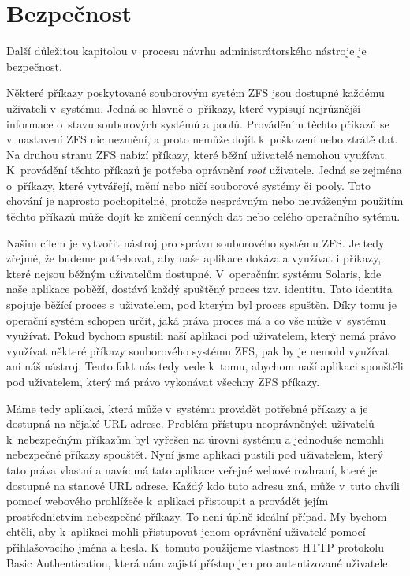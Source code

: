\section{Bezpečnost}
Další důležitou kapitolou v~procesu návrhu administrátorského nástroje je bezpečnost.

Některé příkazy poskytované souborovým systém ZFS jsou dostupné každému uživateli v~systému. Jedná se hlavně o~příkazy, které vypisují nejrůznější informace o~stavu souborových systémů a poolů. Prováděním těchto příkazů se v~nastavení ZFS nic nezmění, a proto nemůže dojít k~poškození nebo ztrátě dat. Na druhou stranu ZFS nabízí příkazy, které běžní uživatelé nemohou využívat. K~provádění těchto příkazů je potřeba oprávnění \emph{root} uživatele. Jedná se zejména o~příkazy, které vytvářejí, mění nebo ničí souborové systémy či pooly. Toto chování je naprosto pochopitelné, protože nesprávným nebo neuváženým použitím těchto příkazů může dojít ke zničení cenných dat nebo celého operačního sytému.

Našim cílem je vytvořit nástroj pro správu souborového systému ZFS. Je tedy zřejmé, že budeme potřebovat, aby naše aplikace dokázala využívat i příkazy, které nejsou běžným uživatelům dostupné. V~operačním systému Solaris, kde naše aplikace poběží, dostává každý spuštěný proces tzv. identitu. Tato identita spojuje běžící proces s~uživatelem, pod kterým byl proces spuštěn. Díky tomu je operační systém schopen určit, jaká práva proces má a co vše může v~systému využívat. Pokud bychom spustili naší aplikaci pod uživatelem, který nemá právo využívat některé příkazy souborového systému ZFS, pak by je nemohl využívat ani náš nástroj. Tento fakt nás tedy vede k~tomu, abychom naší aplikaci spouštěli pod uživatelem, který má právo vykonávat všechny ZFS příkazy.

Máme tedy aplikaci, která může v~systému provádět potřebné příkazy a je dostupná na nějaké URL adrese. Problém přístupu neoprávněných uživatelů k~nebezpečným příkazům byl vyřešen na úrovni systému a jednoduše nemohli nebezpečné příkazy spouštět. Nyní jsme aplikaci pustili pod uživatelem, který tato práva vlastní a navíc má tato aplikace veřejné webové rozhraní, které je dostupné na stanové URL adrese. Každý kdo tuto adresu zná, může v~tuto chvíli pomocí webového prohlížeče k~aplikaci přistoupit a provádět jejím prostřednictvím nebezpečné příkazy. To není úplně ideální případ. My bychom chtěli, aby k~aplikaci mohli přistupovat jenom oprávnění uživatelé pomocí přihlašovacího jména a hesla. K~tomuto použijeme vlastnost HTTP protokolu Basic Authentication, která nám zajistí přístup jen pro autentizované uživatele.


